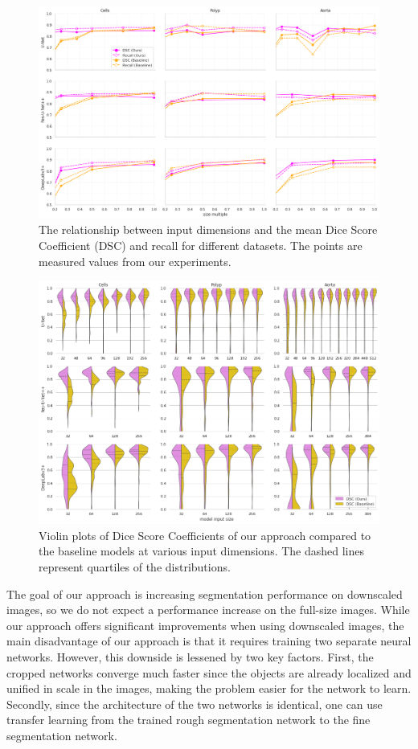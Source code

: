 \begin{figure}[t!]
\centering
\includegraphics[width=\textwidth]{images/5/dsc-vs-size.png}
\caption{The relationship between input dimensions and the mean Dice Score Coefficient (DSC) and recall for different datasets. The points are measured values from our experiments.\label{fig:dsc-vs-size}}
\end{figure}

\begin{figure}[b!]
\centering
\includegraphics[width=\textwidth]{images/5/violin-plots.png}
\caption{Violin plots of Dice Score Coefficients of our approach compared to the baseline models at various input dimensions. The dashed lines represent quartiles of the distributions.\label{fig:box-plots}}
\end{figure}

The goal of our approach is increasing segmentation performance on downscaled images, so we do not expect a performance increase on the full-size images. While our approach offers significant improvements when using downscaled images, the main disadvantage of our approach is that it requires training two separate neural networks. However, this downside is lessened by two key factors. First, the cropped networks converge much faster since the objects are already localized and unified in scale in the images, making the problem easier for the network to learn. Secondly, since the architecture of the two networks is identical, one can use transfer learning from the trained rough segmentation network to the fine segmentation network.

